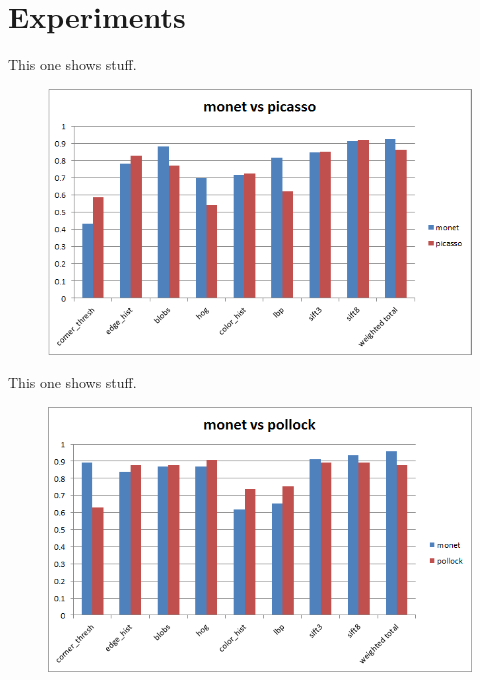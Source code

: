 \documentclass[twocolumn]{article}
\begin{document}
  \section{Experiments}
  This one shows stuff.
  \begin{figure}
    \begin{center}
      \includegraphics{graphs/monet_picasso.png}
    \end{center}
  \end{figure}

  This one shows stuff.
  \begin{figure}
    \begin{center}
      \includegraphics{graphs/monet_pollock.png}
    \end{center}
  \end{figure}
\end{document}
